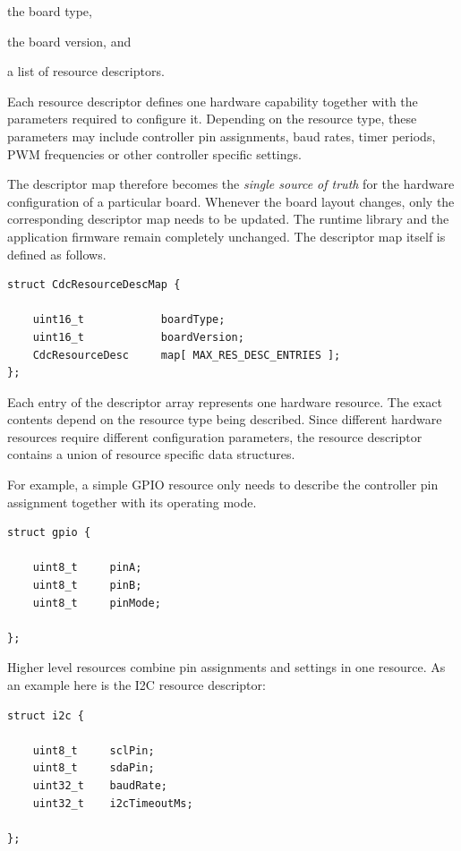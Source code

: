 \begin{smallGapItemize}
\item the board type,
\item the board version, and
\item a list of resource descriptors.
\end{smallGapItemize}

Each resource descriptor defines one hardware capability together with the
parameters required to configure it. Depending on the resource type, these
parameters may include controller pin assignments, baud rates, timer periods,
PWM frequencies or other controller specific settings.

The descriptor map therefore becomes the \emph{single source of truth} for the
hardware configuration of a particular board. Whenever the board layout changes,
only the corresponding descriptor map needs to be updated. The runtime library
and the application firmware remain completely unchanged.
The descriptor map itself is defined as follows.

\lstset{language=c++, style=codesnippetstyle}
\begin{lstlisting}
struct CdcResourceDescMap {

    uint16_t            boardType;
    uint16_t            boardVersion;
    CdcResourceDesc     map[ MAX_RES_DESC_ENTRIES ];
};
\end{lstlisting}
\FloatBarrier

Each entry of the descriptor array represents one hardware resource. The exact
contents depend on the resource type being described. Since different hardware
resources require different configuration parameters, the resource descriptor
contains a union of resource specific data structures.

For example, a simple GPIO resource only needs to describe the controller pin
assignment together with its operating mode.

\lstset{language=c++, style=codesnippetstyle}
\begin{lstlisting}
struct gpio {
            
    uint8_t     pinA;
    uint8_t     pinB;
    uint8_t     pinMode;

};
\end{lstlisting}
\FloatBarrier

Higher level resources combine pin assignments and settings in one resource. 
As an example here is the I2C  resource descriptor:

\lstset{language=c++, style=codesnippetstyle}
\begin{lstlisting}
struct i2c {

    uint8_t     sclPin;
    uint8_t     sdaPin;
    uint32_t    baudRate;
    uint32_t    i2cTimeoutMs; 

};
\end{lstlisting}
\FloatBarrier

